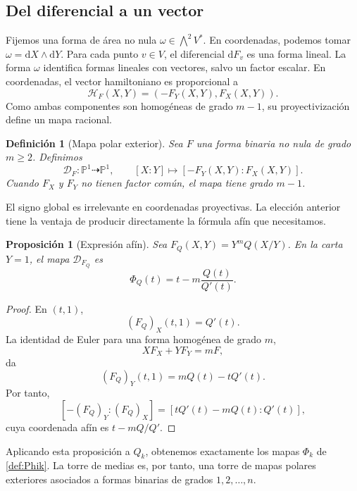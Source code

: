 \documentclass[11pt,oneside]{scrartcl}
\theoremstyle{plainblue}
\newtheorem{proposition}[theorem]{Proposición}
\theoremstyle{definitionblue}
\newtheorem{definition}[theorem]{Definición}
\theoremstyle{remarkgray}
\newcommand{\PP}{\mathbb{P}}
\newcommand{\dd}{\mathrm{d}}
\newcommand{\cD}{\mathcal{D}}
\newcommand{\cH}{\mathcal{H}}
\begin{document}
\subsection{Del diferencial a un vector}

Fijemos una forma de área no nula \(\omega\in\bigwedge^2V^*\). En coordenadas,
podemos tomar \(\omega=\dd X\wedge\dd Y\). Para cada punto \(v\in V\), el
diferencial \(\dd F_v\) es una forma lineal. La forma \(\omega\) identifica formas
lineales con vectores, salvo un factor escalar. En coordenadas, el vector hamiltoniano
es proporcional a
\[
\cH_F(X,Y)=(-F_Y(X,Y),F_X(X,Y)).
\]
Como ambas componentes son homogéneas de grado \(m-1\), su proyectivización define
un mapa racional.

\begin{definition}[Mapa polar exterior]\label{def:polar-map}
Sea \(F\) una forma binaria no nula de grado \(m\ge2\). Definimos
\begin{equation}\label{eq:polar-map-homogeneous}
\cD_F:\PP^1\dashrightarrow\PP^1,
\qquad
[X:Y]\longmapsto[-F_Y(X,Y):F_X(X,Y)].
\end{equation}
Cuando \(F_X\) y \(F_Y\) no tienen factor común, el mapa tiene grado \(m-1\).
\end{definition}

El signo global es irrelevante en coordenadas proyectivas. La elección anterior tiene
la ventaja de producir directamente la fórmula afín que necesitamos.

\begin{proposition}[Expresión afín]\label{prop:affine-polar}
Sea \(F_Q(X,Y)=Y^mQ(X/Y)\). En la carta \(Y=1\), el mapa \(\cD_{F_Q}\) es
\begin{equation}\label{eq:PhiQ}
\boxed{
\Phi_Q(t)=t-m\frac{Q(t)}{Q'(t)}}.
\end{equation}
\end{proposition}

\begin{proof}
En \((t,1)\),
\[
(F_Q)_X(t,1)=Q'(t).
\]
La identidad de Euler para una forma homogénea de grado \(m\),
\[
XF_X+YF_Y=mF,
\]
da
\[
(F_Q)_Y(t,1)=mQ(t)-tQ'(t).
\]
Por tanto,
\[
[-(F_Q)_Y:(F_Q)_X]
=[tQ'(t)-mQ(t):Q'(t)],
\]
cuya coordenada afín es \(t-mQ/Q'\).
\end{proof}

Aplicando esta proposición a \(Q_k\), obtenemos exactamente los mapas \(\Phi_k\) de
\cref{def:Phik}. La torre de medias es, por tanto, una torre de mapas polares
exteriores asociados a formas binarias de grados \(1,2,\dots,n\).
\end{document}
